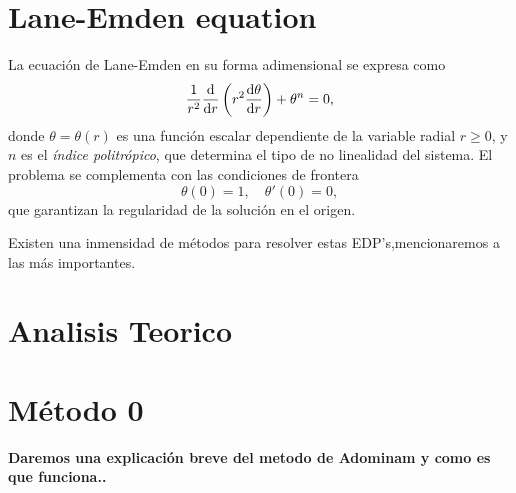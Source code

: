 \documentclass{GEM-JNL-FMP}
\newtheorem{theorem}{Teorema}[section]
\theoremstyle{definition}
\numberwithin{equation}{section}
\begin{document}

\section{Lane-Emden equation}
La ecuación de Lane-Emden en su forma adimensional se expresa como
\begin{equation}\label{eq:lane-emden}
\frac{1}{r^{2}}\diff*{\left(r^{2}\diff{\theta}{r}\right)}{r}+\theta^{n} = 0,
\end{equation}
donde \( \theta = \theta(r) \) es una función escalar dependiente de la variable radial \( r \geq 0 \), y \( n \) es el \emph{índice politrópico}, que determina el tipo de no linealidad del sistema.  
El problema se complementa con las condiciones de frontera
\[
\theta(0) = 1, \quad \theta'(0) = 0,
\]
que garantizan la regularidad de la solución en el origen.

Existen una inmensidad de métodos para resolver estas EDP's,mencionaremos a las más importantes.


\section{Analisis Teorico}



\section{Método 0}
\textbf{Daremos una explicación breve del metodo de Adominam y como es que funciona.\cite{adomian1995}.}
\end{document}
